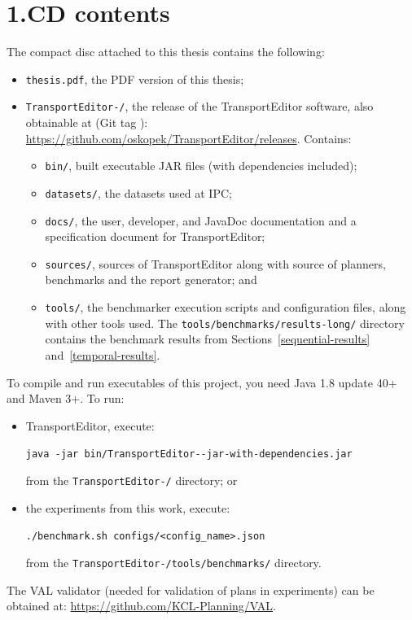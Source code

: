
\section*{1.\;CD contents}\label{cd-contents}

The compact disc attached to this thesis contains the following:

\begin{itemize}
\item \verb+thesis.pdf+, the PDF version of this thesis;
\item \texttt{TransportEditor-\TEver{}/}, the \TEver{} release of the TransportEditor software, also obtainable at (Git tag \TEtag{}):\\
\url{https://github.com/oskopek/TransportEditor/releases}. Contains:
\begin{itemize}
\item \verb+bin/+, built executable JAR files (with dependencies included);
\item \verb+datasets/+, the datasets used at IPC;
\item \verb+docs/+, the user, developer, and JavaDoc documentation and a specification document for TransportEditor;
\item \verb+sources/+, sources of TransportEditor along with source of planners, benchmarks and the report generator; and
\item \verb+tools/+, the benchmarker execution scripts and configuration files, along with other tools used. The \verb+tools/benchmarks/results-long/+ directory contains the benchmark results
from Sections~\ref{sequential-results} and~\ref{temporal-results}.
\end{itemize}
\end{itemize}
To compile and run executables of this project, you need
Java 1.8 update 40+ and Maven 3+.
To run:
\begin{itemize}
\item TransportEditor, execute:
\begin{center}
\texttt{java -jar bin/TransportEditor-\TEver{}-jar-with-dependencies.jar}
\end{center}
from the \texttt{TransportEditor-\TEver{}/} directory; or
\item the experiments from this work, execute:
\begin{center}
\texttt{./benchmark.sh configs/<config\_name>.json}
\end{center}
from the \texttt{TransportEditor-\TEver{}/tools/benchmarks/} directory.
\end{itemize}
The VAL validator (needed for validation of plans in experiments) can be obtained at: \url{https://github.com/KCL-Planning/VAL}.

